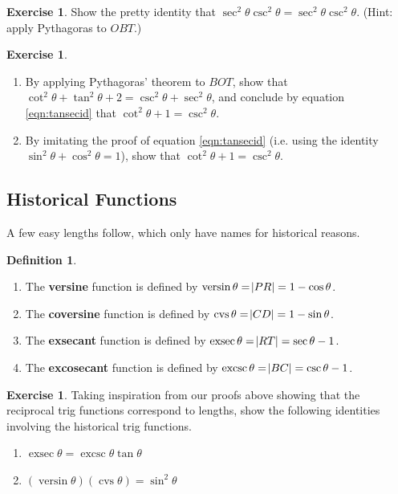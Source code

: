 \documentclass[a4paper,leqno]{article}
\numberwithin{equation}{section}
\theoremstyle{definition}
\newtheorem{defn}[equation]{Definition}
\newtheorem{exercise}[equation]{Exercise}
\theoremstyle{remark}
\newcommand{\df}[1]{\textbf{#1}}
\DeclareMathOperator{\versin}{versin}
\DeclareMathOperator{\cvs}{cvs}
\DeclareMathOperator{\exsec}{exsec}
\DeclareMathOperator{\excsc}{excsc}
\begin{document}
\begin{exercise}
  Show the pretty identity that $ \sec^2 \theta \csc^2 \theta = \sec^2 \theta \csc^2 \theta $. (Hint: apply Pythagoras to $ OBT $.)
\end{exercise}

\begin{exercise}\leavevmode
  \begin{enumerate}
    \item By applying Pythagoras' theorem to $ BOT $, show that $ \cot^2 \theta + \tan^2 \theta + 2 = \csc^2 \theta + \sec^2 \theta $,
          and conclude by equation \ref{eqn:tansecid} that $ \cot^2 \theta + 1 = \csc^2 \theta $.
    \item By imitating the proof of equation \ref{eqn:tansecid} (i.e. using the identity $ \sin^2 \theta + \cos^2 \theta = 1 $), show
          that $ \cot^2 \theta + 1 = \csc^2 \theta $.
  \end{enumerate}
\end{exercise}

\subsection{Historical Functions}
A few easy lengths follow, which only have names for historical reasons.
\begin{defn}\leavevmode
  \begin{enumerate}
    \item The \df{versine} function is defined by $ \versin \theta = \abs{PR} = 1 - \cos \theta $.
    \item The \df{coversine} function is defined by $ \cvs \theta = \abs{CD} = 1 - \sin \theta $.
    \item The \df{exsecant} function is defined by $ \exsec \theta = \abs{RT} = \sec \theta - 1 $.
    \item The \df{excosecant} function is defined by $ \excsc \theta = \abs{BC} = \csc \theta - 1$.
  \end{enumerate}
\end{defn}

\begin{exercise}
  Taking inspiration from our proofs above showing that the reciprocal trig functions correspond
  to lengths, show the following identities involving the historical trig functions.
  \begin{enumerate}
    \item $ \exsec \theta = \excsc \theta \tan \theta $
    \item $ (\versin \theta)(\cvs \theta) = \sin^2 \theta $
  \end{enumerate}
\end{exercise}
\end{document}
